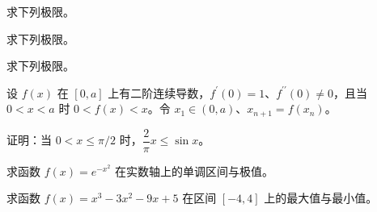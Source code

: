 \newpage
\noindent\begin{minipage}{\textwidth}
求下列极限。
\end{minipage}\par\vfill
\noindent\begin{minipage}{\textwidth}
求下列极限。
\end{minipage}\par\vfill
\noindent\begin{minipage}{\textwidth}
求下列极限。
\end{minipage}\par\vfill
\noindent\begin{minipage}{\textwidth}
设 $f(x)$ 在 $[0,a]$ 上有二阶连续导数，$f^{\prime}(0)=1$、$f^{\prime\prime}(0)\ne0$，且当 $0<x<a$ 时 $0<f(x)<x$。令 $x_1\in(0,a)$、$x_{n+1}=f(x_n)$。
\end{minipage}\par\vfill
\newpage
\noindent\begin{minipage}{\textwidth}
证明：当 $0<x\le\pi/2$ 时，$\dfrac2\pi x\le\sin x$。
\end{minipage}\par\vfill
\noindent\begin{minipage}{\textwidth}
求函数 $f(x)=e^{-x^2}$ 在实数轴上的单调区间与极值。
\end{minipage}\par\vfill
\noindent\begin{minipage}{\textwidth}
求函数 $f(x)=x^3-3x^2-9x+5$ 在区间 $[-4,4]$ 上的最大值与最小值。
\end{minipage}\par\vfill
